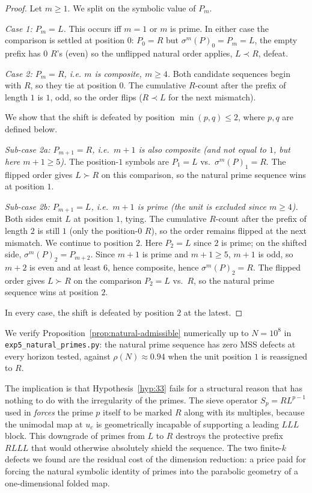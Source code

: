 \documentclass[11pt,a4paper]{article}
\theoremstyle{definition}
\begin{document}
\begin{proof}
Let $m \geq 1$. We split on the symbolic value of $P_m$.

\emph{Case 1: $P_m = L$.} This occurs iff $m = 1$ or $m$ is prime. In
either case the comparison is settled at position $0$: $P_0 = R$ but
$\sigma^m(P)_0 = P_m = L$, the empty prefix has $0$ $R$'s (even) so the
unflipped natural order applies, $L \prec R$, defeat.

\emph{Case 2: $P_m = R$, i.e. $m$ is composite, $m \geq 4$.} Both
candidate sequences begin with $R$, so they tie at position $0$. The
cumulative $R$-count after the prefix of length $1$ is $1$, odd, so the
order flips ($R \prec L$ for the next mismatch).

We show that the shift is defeated by position $\min(p, q) \leq 2$,
where $p, q$ are defined below.

\emph{Sub-case 2a: $P_{m+1} = R$, i.e.\ $m + 1$ is also composite (and
not equal to $1$, but here $m + 1 \geq 5$).} The position-$1$ symbols
are $P_1 = L$ vs.\ $\sigma^m(P)_1 = R$. The flipped order gives
$L \succ R$ on this comparison, so the natural prime sequence wins at
position $1$.

\emph{Sub-case 2b: $P_{m+1} = L$, i.e.\ $m + 1$ is prime (the unit is
excluded since $m \geq 4$).} Both sides emit $L$ at position $1$, tying.
The cumulative $R$-count after the prefix of length $2$ is still $1$
(only the position-$0$ $R$), so the order remains flipped at the next
mismatch. We continue to position $2$. Here $P_2 = L$ since $2$ is
prime; on the shifted side, $\sigma^m(P)_2 = P_{m+2}$. Since $m + 1$ is
prime and $m + 1 \geq 5$, $m + 1$ is odd, so $m + 2$ is even and at
least $6$, hence composite, hence $\sigma^m(P)_2 = R$. The flipped
order gives $L \succ R$ on the comparison $P_2 = L$ vs.\ $R$, so the
natural prime sequence wins at position $2$.

In every case, the shift is defeated by position $2$ at the latest.
\end{proof}

We verify Proposition~\ref{prop:natural-admissible} numerically up to
$N = 10^8$ in \texttt{exp5\_natural\_primes.py}: the natural prime
sequence has zero MSS defects at every horizon tested, against
$\rho(N) \approx 0.94$ when the unit position $1$ is reassigned to $R$.

The implication is that Hypothesis~\ref{hyp:33} fails for a structural
reason that has nothing to do with the irregularity of the primes. The
sieve operator $S_p = R L^{p-1}$ used in \cite{wang2026emergence}
\emph{forces} the prime $p$ itself to be marked $R$ along with its
multiples, because the unimodal map at $u_c$ is geometrically incapable
of supporting a leading $L L L$ block. This downgrade of primes from
$L$ to $R$ destroys the protective prefix $R L L L$ that would otherwise
absolutely shield the sequence. The two finite-$k$ defects we found are
the residual cost of the dimension reduction: a price paid for forcing
the natural symbolic identity of primes into the parabolic geometry of
a one-dimensional folded map.
\end{document}
